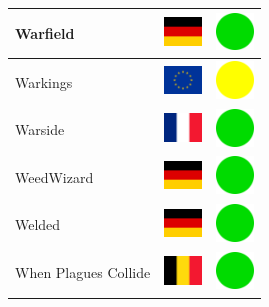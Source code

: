 \documentclass[12pt, a4paper, twoside]{report}
\begin{document}
\begin{center}
\begin{longtable}{|p{5cm}|p{2cm}|p{2cm}|}
 Warfield                                                   & \includegraphics[width=1cm]{../4x3/de} &   \includegraphics[width=1cm]{../likes/y} \\ \hline
 Warkings                                                   & \includegraphics[width=1cm]{../4x3/eu} &   \includegraphics[width=1cm]{../likes/m} \\ \hline
 Warside                                                    & \includegraphics[width=1cm]{../4x3/fr} &   \includegraphics[width=1cm]{../likes/y} \\ \hline
 WeedWizard                                                 & \includegraphics[width=1cm]{../4x3/de} &   \includegraphics[width=1cm]{../likes/y} \\ \hline
 Welded                                                     & \includegraphics[width=1cm]{../4x3/de} &   \includegraphics[width=1cm]{../likes/y} \\ \hline
 When Plagues Collide                                       & \includegraphics[width=1cm]{../4x3/be} &   \includegraphics[width=1cm]{../likes/y} \\ \hline

\end{longtable}
\end{center}
\end{document}
